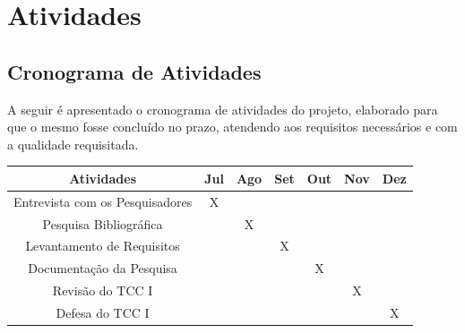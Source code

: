 
\section{Atividades}
\label{sec:atividades}

	\subsection{Cronograma de Atividades}
	\label{subsec:cronograma-atividades}

	A seguir é apresentado o cronograma de atividades do projeto, elaborado para que o mesmo fosse concluído no prazo, atendendo aos requisitos necessários e com a qualidade requisitada.

	\begin{quadro}[h]
		\caption{Cronograma de Atividades TCC I}
		\centering
		\begin{tabular}{c c c c c c c} \hline
			\label{quad:cronograma-atividades}
			\textbf{Atividades}             & \textbf{Jul} & \textbf{Ago} & \textbf{Set} & \textbf{Out} & \textbf{Nov} & \textbf{Dez} \\ \hline
			Entrevista com os Pesquisadores & X            &              &              &              &              &              \\ \hline
			Pesquisa Bibliográfica          &              & X            &              &              &              &              \\ \hline
			Levantamento de Requisitos      &              &              & X            &              &              &              \\ \hline
			Documentação da Pesquisa        &              &              &              & X            &              &              \\ \hline
			Revisão do TCC I                &              &              &              &              & X            &              \\ \hline
			Defesa do TCC I                 &              &              &              &              &              & X            \\ \hline
		\end{tabular}
	\end{quadro}

